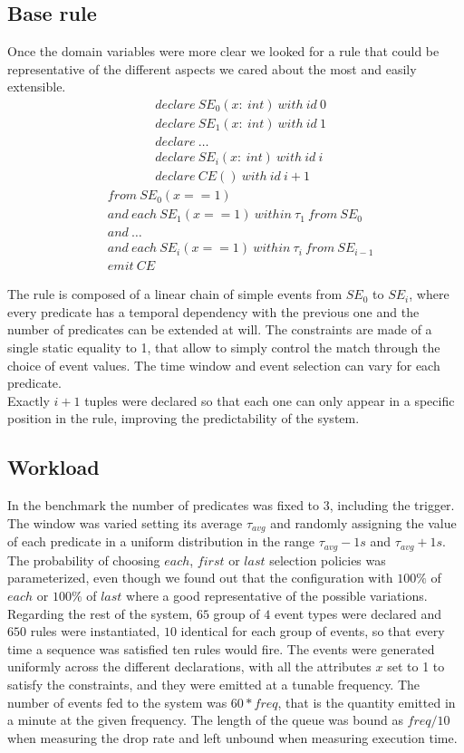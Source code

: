 \subsection{Base rule}
Once the domain variables were more clear we looked for a rule that could be representative of the different aspects we cared about the most and easily extensible.
\begin{align*}
&declare\ SE_0(x:\ int)\ with\ id\ 0\\
&declare\ SE_1(x:\ int)\ with\ id\ 1\\
&declare\ \ldots\\
&declare\ SE_i(x:\ int)\ with\ id\ i\\
&declare\ CE()\ with\ id\ i+1
\end{align*}
\begin{align*}
&from\ SE_0(x == 1)\\
&and\ each\ SE_1(x == 1)\ within\ \tau_1\ from\ SE_0\\
&and\ \ldots\\
&and\ each\ SE_i(x == 1)\ within\ \tau_i\ from\ SE_{i-1}\\
&emit\ CE
\end{align*}

The rule is composed of a linear chain of simple events from $SE_0$ to $SE_i$, where every predicate has a temporal dependency with the previous one and the number of predicates can be extended at will. The constraints are made of a single static equality to 1, that allow to simply control the match through the choice of event values. The time window and event selection can vary for each predicate.\\
Exactly $i+1$ tuples were declared so that each one can only appear in a specific position in the rule, improving the predictability of the system.

\subsection{Workload}
In the benchmark the number of predicates was fixed to $3$, including the trigger. The window was varied setting its average $\tau_{avg}$ and randomly assigning the value of each predicate in a uniform distribution in the range $\tau_{avg} - 1s$ and $\tau_{avg} + 1s$. The probability of choosing $each$, $first$ or $last$ selection policies was parameterized, even though we found out that the configuration with $100\%$ of $each$ or $100\%$ of $last$ where a good representative of the possible variations.\\
Regarding the rest of the system, $65$ group of $4$ event types were declared and $650$ rules were instantiated, $10$ identical for each group of events, so that every time a sequence was satisfied ten rules would fire. The events were generated uniformly across the different declarations, with all the attributes $x$ set to 1 to satisfy the constraints, and they were emitted at a tunable frequency. The number of events fed to the system was $60 * freq$, that is the quantity emitted in a minute at the given frequency. The length of the queue was bound as $freq / 10$ when measuring the drop rate and left unbound when measuring execution time.

